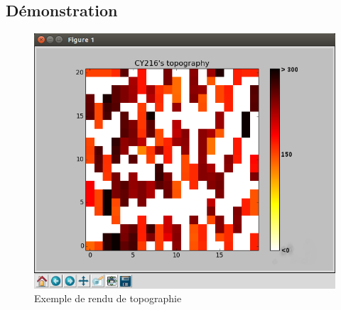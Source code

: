 \documentclass{beamer}
\begin{document}
{      \subsection{Démonstration}
	\begin{frame} %
	  \begin{figure}[htbp]
	    \centering
	    \includegraphics[scale=0.3]{img/topography_example.png}
	    \caption{Exemple de rendu de topographie}
	  \end{figure} 
	\end{frame}
	
	\begin{frame} %
	  \par
	\end{frame}
  }
  
\end{document}
